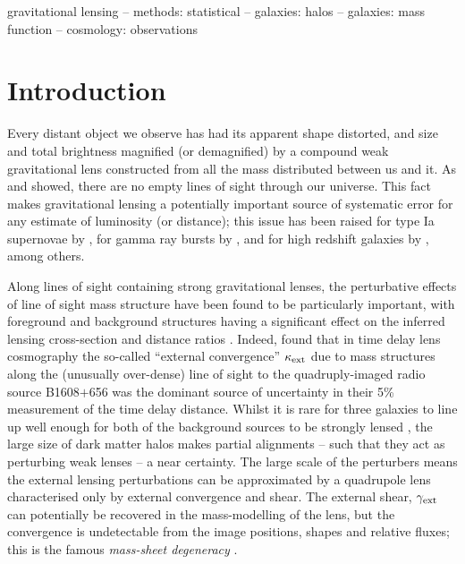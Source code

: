 \documentclass[useAMS,usenatbib]{mn2e}
\begin{document}

\begin{keywords}
  gravitational lensing   --
  methods: statistical    --
  galaxies: halos         --
  galaxies: mass function  --
  cosmology: observations
\end{keywords}

\setcounter{footnote}{1}


\section{Introduction}
\label{sec:intro}

Every distant object we observe has had its apparent shape distorted,
and size and total brightness magnified (or demagnified) by a compound
weak gravitational lens constructed from all the mass distributed
between us and it. As \citet{Vale+White2003} and \citet{HilbertEtal2007}
showed, there are no empty lines of sight through our universe. This
fact makes gravitational lensing a potentially important source of
systematic error for any estimate of luminosity (or distance); this 
issue has been 
raised for \eg type Ia supernovae by
\citet[][]{Holz+Wald1998,Holz+Linder2005}, for gamma ray bursts by
\citet[][]{Oguri+Takahashi2006,Wang+Dai2011},  and for high redshift
galaxies by \citet{BradacEtal2009}, among others. 

Along lines of sight containing strong gravitational lenses, the
perturbative effects of line of sight mass structure have been found to
be particularly important, with foreground and background structures
having a significant effect on the inferred lensing cross-section
\citep[\eg][]{WongEtal2012} and distance ratios
\citep[][]{DalalEtal2005}. Indeed, \citet{SuyuEtal2010} found that in
time delay lens cosmography the so-called ``external convergence''
$\kappa_{\rm ext}$ due to mass structures along the (unusually over-dense) line
of sight to the quadruply-imaged radio source B1608$+$656 was the
dominant source of uncertainty in their 5\% measurement of the time delay distance. 
Whilst it is rare for three galaxies to line up well enough for both of
the background sources to be strongly lensed \citep{GavazziEtal2008,CollettEtal2012a}, 
the large size of dark matter halos makes partial alignments -- such that they
act as perturbing weak lenses --  a near certainty. The large scale of the
perturbers means the external lensing perturbations can be approximated
by a quadrupole lens characterised only by external convergence and shear.
The external shear, $\gamma_{\rm ext}$ can potentially be recovered in the
mass-modelling of the lens, but the convergence is undetectable from the
image positions, shapes and relative fluxes; this is the famous {\emph{ 
mass-sheet degeneracy}} \citep[see e.g.][for details]{FalcoEtal1985}.
\end{document}

